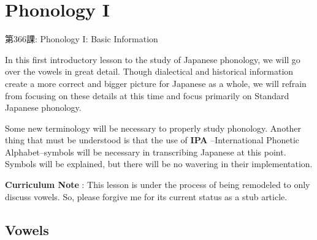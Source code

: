     
\chapter{Phonology I}

\begin{center}
\begin{Large}
第366課: Phonology I: Basic Information 
\end{Large}
\end{center}
 
\par{ In this first introductory lesson to the study of Japanese phonology, we will go over the vowels in great detail. Though dialectical and historical information create a more correct and bigger picture for Japanese as a whole, we will refrain from focusing on these details at this time and focus primarily on Standard Japanese phonology. }

\par{ Some new terminology will be necessary to properly study phonology. Another thing that must be understood is that the use of \textbf{IPA }--International Phonetic Alphabet--symbols will be necessary in transcribing Japanese at this point. Symbols will be explained, but there will be no wavering in their implementation. }

\par{\textbf{Curriculum Note }: This lesson is under the process of being remodeled to only discuss vowels. So, please forgive me for its current status as a stub article. }
      
\section{Vowels}
 

